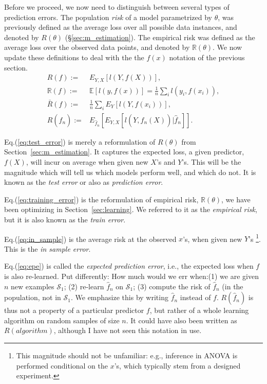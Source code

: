 \documentclass[12pt,a4paper]{article}
\theoremstyle{plain}
\theoremstyle{definition}
\newcommand{\expectg}[2]{E_{#1}\left[ #2 \right]}
\newcommand{\expectn}[1]{\mathbb{E}[#1]}
\newcommand{\loss}{l}
\newcommand{\risk}{R}
\newcommand{\riskn}{\mathbb{R}}
\newcommand{\hyp}{f}
\newcommand{\sample}{\mathcal{S}}
\newcommand{\test}{\risk(\hyp)}
\newcommand{\train}{\riskn(\hyp)}
\newcommand{\insample}{\bar{\risk}(\hyp)}
\newcommand{\EPE}{\risk(\hat{\hyp}_n)}
\begin{document}
Before we proceed, we now need to distinguish between several types of prediction errors.
The population \emph{risk} of a model parametrized by $\theta$, was previously defined as the average loss over all possible data instances, and denoted by $\risk(\theta)$ (\S \ref{sec:m_estimation}).
The empirical risk was defined as the average loss over the observed data points, and denoted by $\riskn(\theta)$.
We now update these definitions to deal with the the $\hyp(x)$ notation of the previous section.
\begin{align}
	\test :=& \expectg{Y,X}{\loss(Y,\hyp(X))}, \label{eq:test_error} \\
	\train :=& \expectn{\loss(y,\hyp(x))} = \frac{1}{n} \sum_i \loss(y_i,\hyp(x_i)),  \label{eq:training_error} \\
	\insample :=& \frac{1}{n} \sum_i \expectg{Y}{\loss(Y,\hyp(x_i))}, \label{eq:in_sample} \\
	\EPE :=& \expectg{\hat{\hyp}_n}{
		\expectg{Y,X}{\loss(Y,\hat{\hyp}_n(X))|\hat{\hyp}_n}
	}.\label{eq:epe}
\end{align}

Eq.(\ref{eq:test_error}) is merely a reformulation of $\risk(\theta)$ from Section~\ref{sec:m_estimation}.
It captures the expected loss, a given predictor, $\hyp(X)$, will incur on average when given new $X$'s and $Y$'s.
This will be the magnitude which will tell us which models perform well, and which do not.
It is known as the \emph{test error} or also as \emph{prediction error}.

Eq.(\ref{eq:training_error}) is the reformulation of empirical risk, $\riskn(\theta)$, we have been optimizing in Section~\ref{sec:learning}.
We referred to it as the \emph{empirical risk}, but it is also known as the \emph{train error}.

Eq.(\ref{eq:in_sample}) is the average risk at the observed $x$'s, when given new $Y$'s \footnote{This magnitude should not be unfamiliar: e.g., inference in ANOVA is performed conditional on the $x$'s, which typically stem from a designed experiment.}.
This is the \emph{in sample error}.

Eq.(\ref{eq:epe}) is called the \emph{expected prediction error}, i.e., the expected loss when $\hyp$ is also re-learned. 
Put differently: How much would we err when:(1) we are given $n$ new examples $\sample_1$; (2) re-learn $\hat{\hyp}_n$ on $\sample_1$; (3) compute the risk of $\hat{\hyp}_n$ (in the population, not in $\sample_1$.
We emphasize this by writing $\hat{\hyp}_n$ instead of $\hyp$.
$\EPE$ is thus not a property of a particular predictor $\hyp$, but rather of a whole learning algorithm on random samples of size $n$.
It could have also been written as $\risk(algorithm)$, although I have not seen this notation in use.
\end{document}
